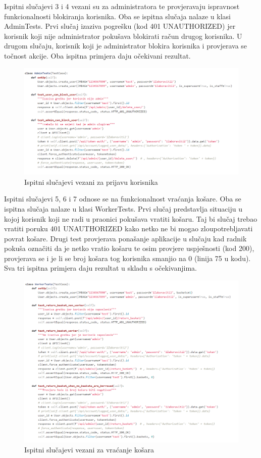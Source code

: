			Ispitni slučajevi 3 i 4 vezani su za administratora te provjeravaju ispravnost funkcionalnosti blokiranja korisnika. Oba se ispitna slučaja nalaze u klasi AdminTests. Prvi slučaj izaziva pogrešku (kod 401 UNAUTHORIZED) jer korisnik koji nije administrator pokušava blokirati račun drugog korisnika. U drugom slučaju, korisnik koji je administrator blokira korisnika i provjerava se točnost akcije. Oba ispitna primjera daju očekivani rezultat.
			
			\begin{figure}[H]
				\centering
				\includegraphics[scale=0.65]{slike/AdminTests.PNG}
				\caption{Ispitni slučajevi vezani za prijavu korisnika}
				\label{fig:promjene}
			\end{figure}
	
			Ispitni slučajevi 5, 6 i 7 odnose se na funkcionalnost vraćanja košare. Oba se ispitna slučaja nalaze u klasi WorkerTests. Prvi slučaj predstavlja situaciju u kojoj korisnik koji ne radi u praonici pokušava vratiti košaru. Taj bi slučaj trebao vratiti poruku 401 UNAUTHORIZED kako netko ne bi mogao zloupotrebljavati povrat košare. Drugi test provjerava ponašanje aplikacije u slučaju kad radnik pokuša označiti da je netko vratio košaru te osim provjere uspješnosti (kod 200), provjerava se i je li se broj košara tog korisnika smanjio na 0 (linija 75 u kodu). Sva tri ispitna primjera daju rezultat u skladu s očekivanjima.
			
			\begin{figure}[H]
				\centering
				\includegraphics[scale=0.65]{slike/WorkerTests.PNG}
				\caption{Ispitni slučajevi vezani za vraćanje košara}
				\label{fig:promjene}
			\end{figure}
		

